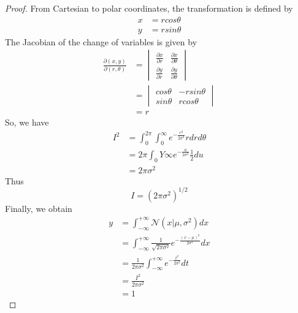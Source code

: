 \documentclass[12pt]{article}
\newenvironment{exercise}[2][Ex]{\begin{trivlist}
\item[\hskip \labelsep {\bfseries #1}\hskip \labelsep {\bfseries #2.}]}{\end{trivlist}}
\begin{document}
\begin{exercise}{1.7(**)}
    \begin{proof}
        From Cartesian to polar coordinates, the transformation is defined by
        \begin{equation*}
            \begin{split}
                x&=rcos\theta\\
                y&=rsin\theta
            \end{split}
        \end{equation*}
        The Jacobian of the change of variables is given by
        \begin{align*}
            \frac{\partial(x,y)}{\partial(r,\theta)}&=\begin{vmatrix}
                \frac{\partial x}{\partial r}&\frac{\partial x}{\partial \theta}\\
                \frac{\partial y}{\partial r}&\frac{\partial y}{\partial \theta}
            \end{vmatrix}\\
            &=\begin{vmatrix}
                cos\theta & -rsin\theta\\
                sin\theta & rcos\theta
            \end{vmatrix}\\
            &=r
        \end{align*}
        So, we have
        \begin{align*}
            I^2&=\int_0^{2\pi}\int_0^\infty e^{-\frac{r^2}{2\sigma^2}}rdrd\theta\\
            &=2\pi\int_0Y\infty e^{-\frac{u}{2\sigma^2}}\frac{1}{2}du\\
            &=2\pi\sigma^2
        \end{align*}
        Thus
        \[
            I=(2\pi\sigma^2)^{1/2}
            \]
        Finally, we obtain
        \begin{align*}
            y&=\int_{-\infty}^{+\infty}\mathcal{N}(x|\mu,\sigma^2)dx\\
            &=\int_{-\infty}^{+\infty}\frac{1}{\sqrt{2\pi\sigma^2}}e^{-\frac{(x-\mu)^2}
            {2\sigma^2}}dx\\
            &=\frac{1}{2\pi\sigma^2}\int_{-\infty}^{+\infty}e^{-\frac{t^2}{2\sigma^2}}dt\\
            &=\frac{I^2}{2\pi\sigma^2}\\
            &=1
        \end{align*}
    \end{proof}
\end{exercise}
\end{document}
